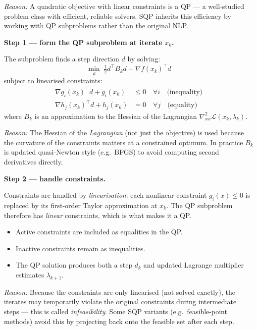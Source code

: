\documentclass[10pt,a4paper]{article}
\newcommand{\reason}[1]{%
  \begin{mdframed}[backgroundcolor=reasonbg, linewidth=0.4pt,
    innertopmargin=3pt, innerbottommargin=3pt,
    innerleftmargin=6pt, innerrightmargin=6pt]
    \small\textit{Reason:} \small #1
  \end{mdframed}\vspace{2pt}}
\begin{document}
\reason{A quadratic objective with linear constraints is a QP --- a
        well-studied problem class with efficient, reliable solvers.
        SQP inherits this efficiency by working with QP subproblems
        rather than the original NLP.}

\textbf{Step 1 --- form the QP subproblem at iterate $x_k$.}

The subproblem finds a step direction $d$ by solving:
\[
  \min_{d}\;\tfrac{1}{2}d^\top B_k d + \nabla f(x_k)^\top d
\]
subject to linearised constraints:
\begin{align*}
  \nabla g_i(x_k)^\top d + g_i(x_k) &\le 0 \quad \forall i \quad \text{(inequality)}\\
  \nabla h_j(x_k)^\top d + h_j(x_k) &= 0  \quad \forall j \quad \text{(equality)}
\end{align*}
where $B_k$ is an approximation to the Hessian of the Lagrangian
$\nabla^2_{xx}\mathcal{L}(x_k, \lambda_k)$.

\reason{The Hessian of the \emph{Lagrangian} (not just the objective) is
        used because the curvature of the constraints matters at a
        constrained optimum. In practice $B_k$ is updated
        quasi-Newton style (e.g.\ BFGS) to avoid computing second
        derivatives directly.}

\textbf{Step 2 --- handle constraints.}

Constraints are handled by \emph{linearisation}: each nonlinear
constraint $g_i(x)\le 0$ is replaced by its first-order Taylor
approximation at $x_k$. The QP subproblem therefore has \emph{linear}
constraints, which is what makes it a QP.

\begin{itemize}[noitemsep]
  \item Active constraints are included as equalities in the QP.
  \item Inactive constraints remain as inequalities.
  \item The QP solution produces both a step $d_k$ and updated
        Lagrange multiplier estimates $\lambda_{k+1}$.
\end{itemize}

\reason{Because the constraints are only linearised (not solved exactly),
        the iterates may temporarily violate the original constraints
        during intermediate steps --- this is called \emph{infeasibility}.
        Some SQP variants (e.g.\ feasible-point methods) avoid this by
        projecting back onto the feasible set after each step.}
\end{document}
